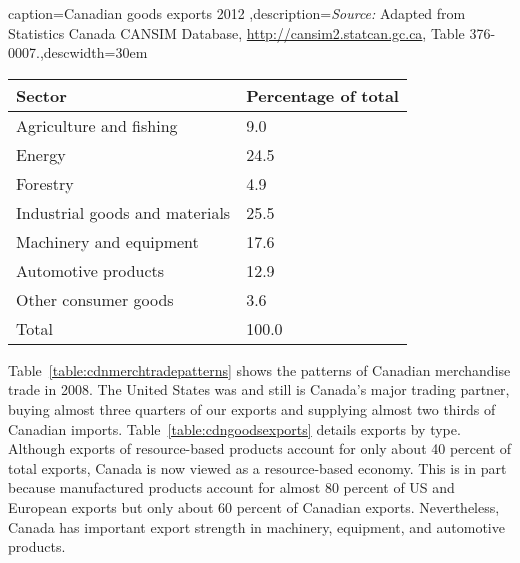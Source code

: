 \begin{Table}{caption={Canadian goods exports 2012 \label{table:cdngoodsexports}},description={\textit{Source:} Adapted from Statistics Canada CANSIM Database, \url{http://cansim2.statcan.gc.ca}, Table 376-0007.},descwidth={30em}}
	\begin{tabu} to 30em {|X[2.5,l]X[1,c]|}	\hline
			\textbf{Sector}								&	\textbf{Percentage of total}	\\	\hline
		Agriculture and fishing				&	9.0					\\
			Energy								&	24.5				\\
		Forestry							&	4.9					\\
			Industrial goods and materials		&	25.5				\\
		Machinery and equipment				&	17.6				\\
			Automotive products					&	12.9				\\
		Other consumer goods				&	3.6					\\
			Total								&	100.0				\\	\hline
	\end{tabu}
\end{Table}

Table~\ref{table:cdnmerchtradepatterns} shows the patterns of Canadian
merchandise trade in 2008. The United States was and still is Canada's major
trading partner, buying almost three quarters of our exports and supplying almost 
two thirds of Canadian imports. Table~\ref{table:cdngoodsexports} details
exports by type. Although exports of resource-based products account for
only about 40 percent of total exports, Canada is now viewed as a
resource-based economy. This is in part because manufactured products
account for almost 80 percent of US and European exports but only about 60
percent of Canadian exports. Nevertheless, Canada has important export
strength in machinery, equipment, and automotive products.
